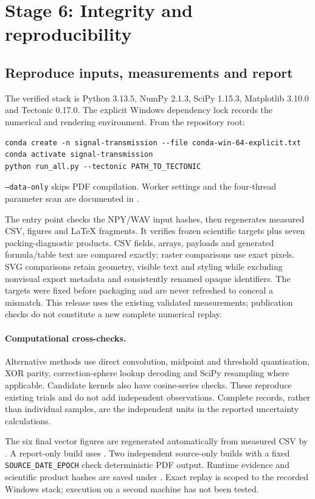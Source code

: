 \FloatBarrier
\section{Stage 6: Integrity and reproducibility}
\subsection{Reproduce inputs, measurements and report}
\label{sec:r61}
The verified stack is Python 3.13.5, NumPy 2.1.3, SciPy 1.15.3,
Matplotlib 3.10.0 and Tectonic 0.17.0. The explicit Windows dependency
lock records the numerical and rendering environment. From the repository root:
\par\noindent\begin{minipage}{\linewidth}\small\begin{verbatim}
conda create -n signal-transmission --file conda-win-64-explicit.txt
conda activate signal-transmission
python run_all.py --tectonic PATH_TO_TECTONIC
\end{verbatim}\end{minipage}\par
\texttt{--data-only} skips PDF compilation. Worker settings and the
four-thread parameter scan are documented in .

The entry point checks the NPY/WAV input hashes, then regenerates measured
CSV, figures and LaTeX fragments. It verifies \RsixProducts{} frozen
scientific targets plus seven packing-diagnostic products. CSV fields,
arrays, payloads and generated formula/table text are compared exactly;
raster comparisons use exact pixels. SVG comparisons retain geometry,
visible text and styling while excluding nonvisual export metadata and
consistently renamed opaque identifiers. The targets were fixed before
packaging and are never refreshed to conceal a mismatch. This release uses
the existing validated measurements; publication checks do not constitute
a new complete numerical replay.

\paragraph{Computational cross-checks.}
Alternative methods use direct convolution, midpoint and threshold
quantisation, XOR parity, correction-sphere lookup decoding and SciPy
resampling where applicable. Candidate kernels also have cosine-series
checks. These reproduce existing trials and do not add independent
observations. Complete records, rather than individual samples, are the
independent units in the reported uncertainty calculations.

The six final vector figures are regenerated automatically from measured
CSV by . A report-only
build uses . Two independent source-only
builds with a fixed \texttt{SOURCE\_DATE\_EPOCH} check deterministic PDF
output. Runtime evidence and scientific product hashes are saved under
. Exact replay is scoped to the recorded Windows
stack; execution on a second machine has not been tested.
